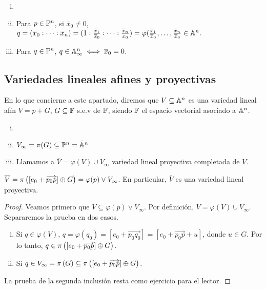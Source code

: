 \begin{obs}
  \begin{enumerate}[i)]
    \item[]
    \item Para $p \in \mathbb{P}^n$, si $\overline{x}_0 \neq 0$, $q = (\overline{x}_0:
      \dots:\overline{x}_n) = (1:\frac{\overline{x}_1}{\overline{x}_0}:
      \dots:\frac{\overline{x}_n}{x_0}) = \varphi(\frac{\overline{x}_1}{\overline{x}_0}
      ,\dots,\frac{\overline{x}_n}{\overline{x}_0} \in \mathbb{A}^n.$
    \item Para $q \in \mathbb{P}^n$, $q \in \mathbb{A}^n_\infty \iff \overline{x}_0 = 0$.
  \end{enumerate}
\end{obs}

\subsection{Variedades lineales afines y proyectivas}

En lo que concierne a este apartado, diremos que $V \subseteq \mathbb{A}^n$ es una variedad 
lineal afín $V = p+G$, $G \subseteq \mathbb{F}$ s.e.v de $\mathbb{F}$, siendo $\mathbb{F}$ el espacio vectorial
asociado a $\mathbb{A}^n$.

\begin{defi}
  \begin{enumerate}[i)]
    \item[]
    \item $V_\infty = \pi(G) \subseteq \mathbb{P}^n = \bar{\mathbb{A}}^n$
    \item Llamamos a $\overline{V} = \varphi(V) \cup V_\infty$ variedad lineal 
      proyectiva completada de $V$.
  \end{enumerate}
\end{defi}

\begin{prop}
  $\overline{V} = \pi \left( [e_0 + \overrightarrow{p_0p}] \oplus G \right) = \varphi(p) \vee
  V_\infty$. En particular, $\overline{V}$ es una variedad lineal proyectiva. 
\end{prop}

\begin{proof}
  Veamos primero que $\overline{V} \subseteq \varphi(p) \vee V_\infty$. Por definición,
  $\overline{V} = \varphi(V) \cup V_\infty$. Separaremos la prueba en dos casos.
  \begin{enumerate}[i)]
    \item Si $q \in \varphi(V)$, $q = \varphi(q_0) = [e_0 + \overrightarrow{p_0q_0}]
        = [e_0 + \overrightarrow{p_0p}+u]$, donde $u \in G$. Por lo tanto,
        $q \in \pi \left([e_0 + \overrightarrow{p_0p}] \oplus G \right)$.
      \item Si $q \in V_\infty = \pi \left( G \right) \subseteq \pi \left( [e_0 + \overrightarrow{p_0
        p}] \oplus G \right)$.
  \end{enumerate}
  
  La prueba de la segunda inclusión resta como ejercicio para el lector.
\end{proof}

